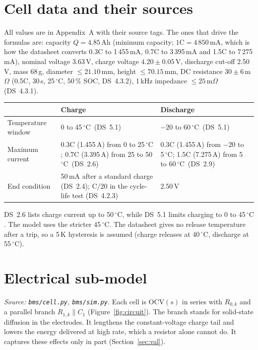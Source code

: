 \documentclass[11pt,a4paper]{article}
\newcommand{\ds}[1]{\textsc{DS}~#1}
\newcommand{\degC}{\ensuremath{{}^{\circ}\mathrm{C}}}
\begin{document}
\section{Cell data and their sources}\label{sec:cell}
All values are in Appendix~A with their source tags. The ones that drive the formulas are: capacity $Q=4.85$\,Ah (minimum capacity; $1\mathrm{C}=4\,850$\,mA, which is how the datasheet converts 0.3C to 1\,455\,mA, 0.7C to 3\,395\,mA and 1.5C to 7\,275\,mA), nominal voltage 3.63\,V, charge voltage $4.20\pm0.05$\,V, discharge cut-off 2.50\,V, mass 68\,g, diameter $\le21.10$\,mm, height $\le70.15$\,mm, DC resistance $30\pm6$\,m$\Omega$ (0.5C, 30\,s, 25\,\degC, 50\,\% SOC, \ds{4.3.2}), 1\,kHz impedance $\le25$\,m$\Omega$ (\ds{4.3.1}).

\begin{longtable}{@{}p{3.2cm}p{5.3cm}p{5.8cm}@{}}
\toprule
 & Charge & Discharge \\
\midrule
\endhead
Temperature window & 0 to 45\,\degC\ (\ds{5.1}) & $-20$ to 60\,\degC\ (\ds{5.1}) \\
Maximum current & 0.3C (1.455\,A) from 0 to 25\,\degC; 0.7C (3.395\,A) from 25 to 50\,\degC\ (\ds{2.6}) & 0.3C (1.455\,A) from $-20$ to 5\,\degC; 1.5C (7.275\,A) from 5 to 60\,\degC\ (\ds{2.9}) \\
End condition & 50\,mA after a standard charge (\ds{2.4}); C/20 in the cycle-life test (\ds{4.2.3}) & 2.50\,V \\
\bottomrule
\end{longtable}
\ds{2.6} lists charge current up to 50\,\degC, while \ds{5.1} limits charging to 0 to 45\,\degC. The model uses the stricter 45\,\degC. The datasheet gives no release temperature after a trip, so a 5\,K hysteresis is assumed (charge releases at 40\,\degC, discharge at 55\,\degC).

\section{Electrical sub-model}\label{sec:elec}
\emph{Source: \texttt{bms/cell.py}, \texttt{bms/sim.py}.} Each cell is $\mathrm{OCV}(s)$ in series with $R_{0,k}$ and a parallel branch $R_{1,k}\parallel C_1$ (Figure~\ref{fig:circuit}). The branch stands for solid-state diffusion in the electrodes. It lengthens the constant-voltage charge tail and lowers the energy delivered at high rate, which a resistor alone cannot do. It captures these effects only in part (Section~\ref{sec:val}).
\end{document}
